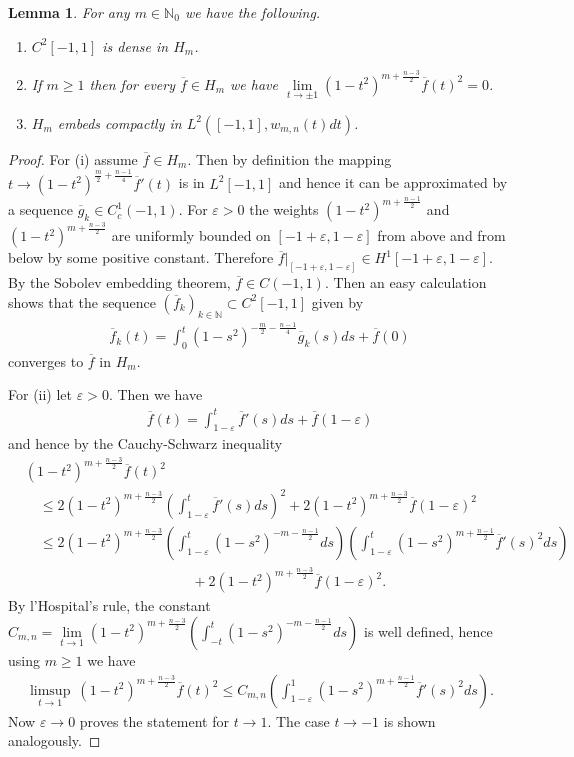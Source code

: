 \documentclass[12pt,twoside]{amsart}
\numberwithin{satz}{section}
\newtheorem{lemma}[satz]{Lemma}
\theoremstyle{definition}
\numberwithin{equation}{section}
\newcommand\N{\mathbb{N}}
\begin{document}
	\begin{lemma}\label{lemma_compact_embedding}
		For any $m\in\N_0$ we have the following.
		\begin{enumerate}
			\item $C^2[-1,1]$ is dense in $H_m$.
			\item If $m\geq 1$ then for every $\overline{f}\in H_m$ we have $\lim\limits_{t\to\pm 1}(1-t^2)^{m+\frac{n-3}{2}}\overline{f}(t)^2=0$. 
			\item $H_m$ embeds compactly in $L^2([-1,1],w_{m,n}(t)dt)$. 
		\end{enumerate} 
	\end{lemma}
	\begin{proof}
		For (i) assume $\overline{f}\in H_m$. Then by definition the mapping $t\to (1-t^2)^{\frac{m}{2}+\frac{n-1}{4}}\overline{f}'(t)$ is in $L^2[-1,1]$ and hence it can be approximated by a sequence $\overline{g}_k\in C^1_c(-1,1)$. For $\varepsilon>0$ the weights $(1-t^2)^{m+\frac{n-1}{2}}$ and $(1-t^2)^{m+\frac{n-3}{2}}$ are uniformly bounded on $[-1+\varepsilon,1-\varepsilon]$ from above and from below by some positive constant. Therefore $\overline{f}|_{[-1+\varepsilon,1-\varepsilon]}\in H^1[-1+\varepsilon,1-\varepsilon]$. By the Sobolev embedding theorem, $\overline{f}\in C(-1,1)$. Then an easy calculation shows that the sequence $(\overline{f}_k)_{k\in\N}\subset C^2[-1,1]$ given by
		\begin{align*}
			\overline{f}_k(t)=\int_0^t (1-s^2)^{-\frac{m}{2}-\frac{n-1}{4}}\overline{g}_k(s)ds + \overline{f}(0)
		\end{align*}
		converges to $\overline{f}$ in $H_m$.
		
		For (ii) let $\varepsilon>0$. Then we have
		\begin{align*}
			\overline{f}(t)=\int_{1-\varepsilon}^{t}\overline{f}'(s)ds + \overline{f}(1-\varepsilon)
		\end{align*}
		and hence by the Cauchy-Schwarz inequality
		\begin{align*}
			&(1-t^2)^{m+\frac{n-3}{2}}\overline{f}(t)^2 \\
			& \quad \leq 2(1-t^2)^{m+\frac{n-3}{2}}\left(\int_{1-\varepsilon}^t \overline{f}'(s)ds\right)^2 + 2(1-t^2)^{m+\frac{n-3}{2}}\overline{f}(1-\varepsilon)^2 \\
			& \quad \leq 2(1-t^2)^{m+\frac{n-3}{2}}\left(\int_{1-\varepsilon}^t (1-s^2)^{-m-\frac{n-1}{2}}ds\right)\left(\int_{1-\varepsilon}^t (1-s^2)^{m+\frac{n-1}{2}}\overline{f}'(s)^2ds\right) \\
			& \hspace{5cm} +  2(1-t^2)^{m+\frac{n-3}{2}}\overline{f}(1-\varepsilon)^2.
		\end{align*}
		By l'Hospital's rule, the constant $C_{m,n}=\lim\limits_{t\to 1} (1-t^2)^{m+\frac{n-3}{2}}\left(\int_{-t}^t (1-s^2)^{-m-\frac{n-1}{2}}ds\right)$ is well defined, hence using $m\geq 1$ we have
		\begin{align*}
			\limsup\limits_{t\to 1} \ (1-t^2)^{m+\frac{n-3}{2}}\overline{f}(t)^2 \leq C_{m,n}\left(\int_{1-\varepsilon}^1 (1-s^2)^{m+\frac{n-1}{2}}\overline{f}'(s)^2ds\right).
		\end{align*}
		Now $\varepsilon\to 0$ proves the statement for $t\to 1$. The case $t\to -1$ is shown analogously.
		

\end{proof}
\end{document}
